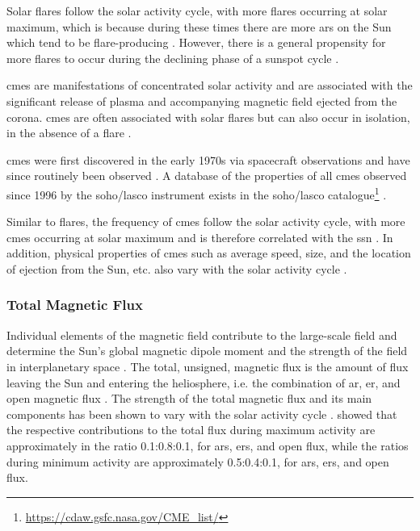 Solar flares follow the solar activity cycle, with more flares occurring at solar maximum, which is because during these times there are more \glspl{ar} on the Sun which tend to be flare-producing \citep{gopalswamy_corona_2010, hathaway_solar_2015}. However, there is a general propensity for more flares to occur during the declining phase of a sunspot cycle \citep{hathaway_solar_2015}.

\glspl{cme} are manifestations of concentrated solar activity and are associated with the significant release of plasma and accompanying magnetic field ejected from the corona. \glspl{cme} are often associated with solar flares but can also occur in isolation, in the absence of a flare \citep{hathaway_solar_2015}.

\glspl{cme} were first discovered in the early 1970s via spacecraft observations and have since routinely been observed \citep{hathaway_solar_2015}. A database of the properties of all \glspl{cme} observed since 1996 by the \gls{soho/lasco} instrument exists in the \gls{soho/lasco} catalogue\footnote{\url{https://cdaw.gsfc.nasa.gov/CME_list/}} \citep{yashiro_catalog_2004, gopalswamy_soholasco_2009}. 

Similar to flares, the frequency of \glspl{cme} follow the solar activity cycle, with more \glspl{cme} occurring at solar maximum \citep{gopalswamy_corona_2010} and is therefore correlated with the \gls{ssn} \citep{webb_solar_1994}. In addition, physical properties of \glspl{cme} such as average speed, size, and the location of ejection from the Sun, etc. also vary with the solar activity cycle \citep{yashiro_catalog_2004}.



\subsubsection*{Total Magnetic Flux}

Individual elements of the magnetic field contribute to the large-scale field and determine the Sun's global magnetic dipole moment and the strength of the field in interplanetary space  \citep{lockwood_doubling_1999, solanki_evolution_2000}. The total, unsigned, magnetic flux is the amount of flux leaving the Sun and entering the heliosphere, i.e. the combination of \gls{ar}, \gls{er}, and open magnetic flux \citep{lockwood_doubling_1999}. The strength of the total magnetic flux and its main components has been shown to vary with the solar activity cycle \citep{solanki_secular_2002, vieira_evolution_2010, chaplin_sensitivity_2019}. \citet{vieira_evolution_2010} showed that the respective contributions to the total flux during maximum activity are approximately in the ratio 0.1:0.8:0.1, for \glspl{ar}, \glspl{er}, and open flux, while the ratios during minimum activity are approximately 0.5:0.4:0.1, for \glspl{ar}, \glspl{er}, and open flux. %



